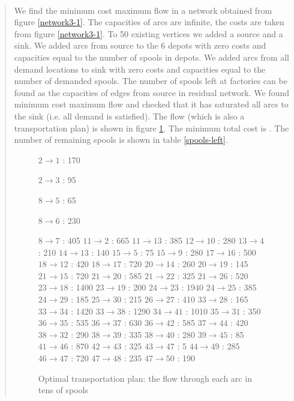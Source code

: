 \begin{quote}
\paragraph{}
We find the minimum cost maximum flow in a network obtained from figure \ref{network3-1}. The capacities of arcs are infinite, the costs are taken from figure \ref{network3-1}. To 50 existing vertices we added a source and a sink. We added arcs from source to the 6 depots with zero costs and capacities equal to the number of spools in depots. We added arcs from all demand locations to sink with zero costs and capacities equal to the number of demanded spools. The number of spools left at factories can be found as the capacities of edges from source in residual network. We found minimum cost maximum flow and checked that it has saturated all arcs to the sink (i.e. all demand is satisfied). The flow (which is also a transportation plan) is shown in figure \ref{flow3-1a}. The minimum total cost is . The number of remaining spools is shown in table \ref{spools-left}.

\begin{figure}[H]
\centering
\begin{multicols}{5}
$ 2 \rightarrow 1 $ : 170

$ 2 \rightarrow 3 $ : 95

$ 8 \rightarrow 5 $ : 65

$ 8 \rightarrow 6 $ : 230

$ 8 \rightarrow 7 $ : 405
$ 11 \rightarrow 2 $ : 665
$ 11 \rightarrow 13 $ : 385
$ 12 \rightarrow 10 $ : 280
$ 13 \rightarrow 4 $ : 210
$ 14 \rightarrow 13 $ : 140
$ 15 \rightarrow 5 $ : 75
$ 15 \rightarrow 9 $ : 280
$ 17 \rightarrow 16 $ : 500
$ 18 \rightarrow 12 $ : 420
$ 18 \rightarrow 17 $ : 720
$ 20 \rightarrow 14 $ : 260
$ 20 \rightarrow 19 $ : 145
$ 21 \rightarrow 15 $ : 720
$ 21 \rightarrow 20 $ : 585
$ 21 \rightarrow 22 $ : 325
$ 21 \rightarrow 26 $ : 520
$ 23 \rightarrow 18 $ : 1400
$ 23 \rightarrow 19 $ : 200
$ 24 \rightarrow 23 $ : 1940
$ 24 \rightarrow 25 $ : 385
$ 24 \rightarrow 29 $ : 185
$ 25 \rightarrow 30 $ : 215
$ 26 \rightarrow 27 $ : 410
$ 33 \rightarrow 28 $ : 165
$ 33 \rightarrow 34 $ : 1420
$ 33 \rightarrow 38 $ : 1290
$ 34 \rightarrow 41 $ : 1010
$ 35 \rightarrow 31 $ : 350
$ 36 \rightarrow 35 $ : 535
$ 36 \rightarrow 37 $ : 630
$ 36 \rightarrow 42 $ : 585
$ 37 \rightarrow 44 $ : 420
$ 38 \rightarrow 32 $ : 290
$ 38 \rightarrow 39 $ : 335
$ 38 \rightarrow 40 $ : 280
$ 39 \rightarrow 45 $ : 85
$ 41 \rightarrow 46 $ : 870
$ 42 \rightarrow 43 $ : 325
$ 43 \rightarrow 47 $ : 5
$ 44 \rightarrow 49 $ : 285
$ 46 \rightarrow 47 $ : 720
$ 47 \rightarrow 48 $ : 235
$ 47 \rightarrow 50 $ : 190
\end{multicols}
\caption{Optimal transportation plan: the flow through each arc in tens of spools}
\label{flow3-1a}
\end{figure}


\end{quote}
